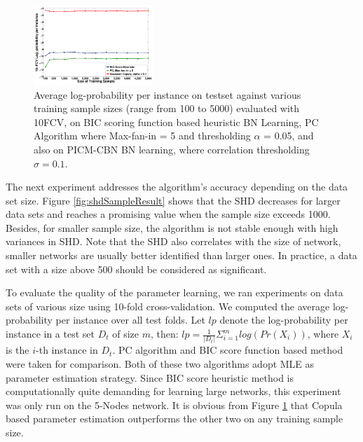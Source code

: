 \documentclass{article}
\begin{document}
\begin{figure}[H]
\centering
\includegraphics[width=0.4\textwidth]{Figures/plotsall/log-prob2}
\caption{
  Average log-probability per instance on testset against various training sample sizes (range from 100 to 5000) evaluated with 10FCV, on BIC scoring function 
  based heuristic BN Learning, PC Algorithm where Max-fan-in = 5 and thresholding $\alpha$ = 0.05, and also on 
  PICM-CBN BN learning, where correlation thresholding $\sigma = 0.1$.
}
\label{fig:logProb}
\end{figure} 
The next experiment addresses the algorithm's accuracy depending on the data set size.
Figure \ref{fig:shdSampleResult} shows that the SHD decreases for larger data sets and
reaches a promising value when the sample 
size exceeds 1000. Besides, for smaller sample size, the algorithm
 is not stable enough with high variances in SHD. 
Note that the SHD also correlates with the size of network, smaller networks are usually better identified than larger ones. In practice, a data set with a size above 500 should be considered as significant.

To evaluate the quality of the parameter learning, we ran experiments on data sets of various size using 10-fold cross-validation. We computed the average log-probability per instance over all test folds.
Let $lp$ denote the 
log-probability per instance in a test set $D_t$ of size $m$, then:
$lp = \frac{1}{|D_t|}\Sigma^m_{i=1}log(Pr(X_i))$, where $X_i$ is the $i$-th instance in $D_t$. PC algorithm and BIC score function based method were taken for comparison. Both of these two algorithms adopt MLE as parameter estimation strategy. Since BIC score heuristic method is computationally quite demanding for learning large networks, this experiment was only run on the 5-Nodes network. It is obvious from Figure \ref{fig:logProb} that Copula based parameter estimation outperforms the other two on any training sample size.
\end{document}
